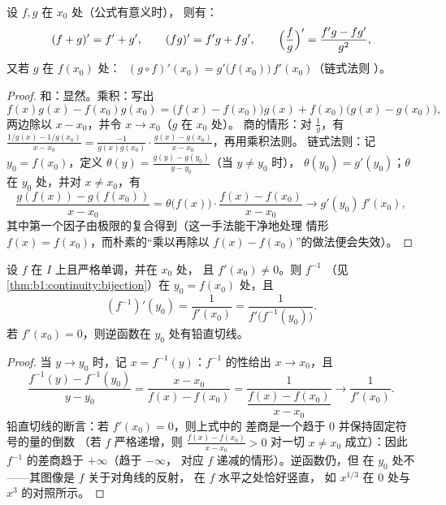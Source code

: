 \begin{theorem}[运算法则]\label{thm:b1:derivative:operations}
设 $f, g$ 在 $x_0$ 处（公式有意义时），
则有：
\[
(f + g)' = f' + g', \qquad
(fg)' = f'g + fg', \qquad
\Bigl(\frac fg\Bigr)' = \frac{f'g - fg'}{g^2},
\]
又若 $g$ 在 $f(x_0)$ 处：
$\;(g \circ f)'(x_0) = g'\bigl(f(x_0)\bigr)\, f'(x_0)$（链式法则
）。
\end{theorem}

\begin{proof}
和：显然。乘积：写出
\[
f(x)g(x) - f(x_0)g(x_0)
= \bigl(f(x) - f(x_0)\bigr) g(x) + f(x_0)\bigl(g(x) - g(x_0)\bigr),
\]
两边除以 $x - x_0$，并令 $x \to x_0$（$g$ 在 $x_0$ 处）。
商的情形：对 $\frac 1g$，有 $\frac{1/g(x) - 1/g(x_0)}{x - x_0} =
\frac{-1}{g(x)g(x_0)}\cdot\frac{g(x) - g(x_0)}{x - x_0}$，再用乘积法则。
链式法则：记 $y_0 = f(x_0)$，定义
$\theta(y) = \frac{g(y) - g(y_0)}{y - y_0}$（当 $y \neq y_0$ 时），
$\theta(y_0) = g'(y_0)$；$\theta$ 在 $y_0$ 处，并对
$x \neq x_0$，有
\[
\frac{g(f(x)) - g(f(x_0))}{x - x_0}
= \theta\bigl(f(x)\bigr)\cdot \frac{f(x) - f(x_0)}{x - x_0}
\longrightarrow g'(y_0)\, f'(x_0),
\]
其中第一个因子由极限的复合得到（这一手法能干净地处理
情形 $f(x) = f(x_0)$，而朴素的“乘以再除以
$f(x) - f(x_0)$”的做法便会失效）。
\end{proof}

\begin{theorem}[反函数的导数]\label{thm:b1:derivative:inverse}
设 $f$ 在 $I$ 上且严格单调，并在 $x_0$ 处，
且 $f'(x_0) \neq 0$。则 $f^{-1}$
（见\cref{thm:b1:continuity:bijection}）在 $y_0 =
f(x_0)$ 处，且
\[
(f^{-1})'(y_0) = \frac{1}{f'(x_0)} = \frac{1}{f'\bigl(f^{-1}(y_0)\bigr)} .
\]
若 $f'(x_0) = 0$，则逆函数在 $y_0$ 处有铅直切线。
\end{theorem}

\begin{proof}
当 $y \to y_0$ 时，记 $x = f^{-1}(y)$：$f^{-1}$ 的性给出 $x
\to x_0$，且
\[
\frac{f^{-1}(y) - f^{-1}(y_0)}{y - y_0}
= \frac{x - x_0}{f(x) - f(x_0)}
= \frac{1}{\dfrac{f(x) - f(x_0)}{x - x_0}}
\longrightarrow \frac{1}{f'(x_0)} .
\]
铅直切线的断言：若 $f'(x_0) = 0$，则上式中的
差商是一个趋于 $0$ 并保持固定符号的量的倒数
（若 $f$ 严格递增，则 $\frac{f(x) -
f(x_0)}{x - x_0} > 0$ 对一切 $x \neq x_0$ 成立）：因此
$f^{-1}$ 的差商趋于 $+\infty$（趋于 $-\infty$，
对应 $f$ 递减的情形）。逆函数仍，但
在 $y_0$ 处不——其图像是 $f$ 关于对角线的反射，
在 $f$ 水平之处恰好竖直，
如 $x^{1/3}$ 在 $0$ 处与 $x^3$ 的对照所示。
\end{proof}

